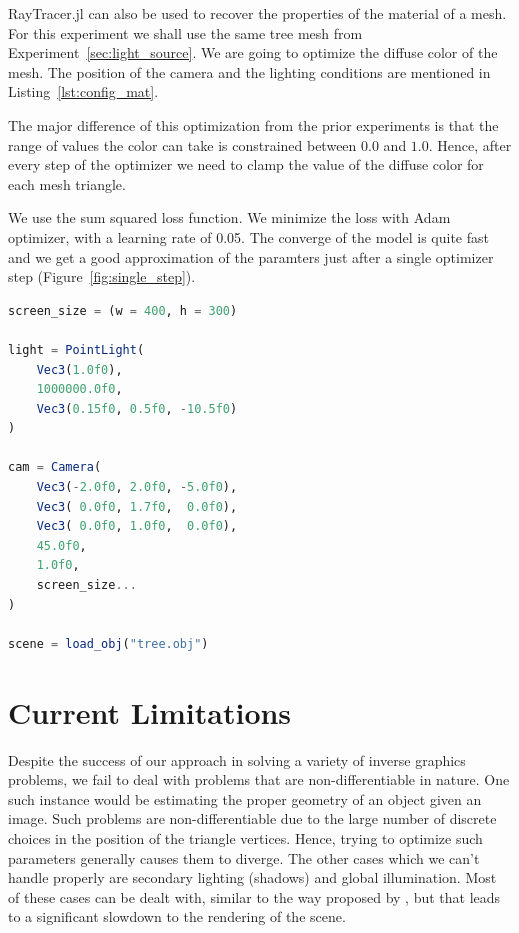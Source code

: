 \documentclass{juliacon}
\begin{document}
RayTracer.jl can also be used to recover the properties of the material of a mesh. For this experiment we shall use the same tree mesh from Experiment~\ref{sec:light_source}. We are going to optimize the diffuse color of the mesh. The position of the camera and the lighting conditions are mentioned in Listing~\ref{lst:config_mat}.

The major difference of this optimization from the prior experiments is that the range of values the color can take is constrained between $0.0$ and $1.0$. Hence, after every step of the optimizer we need to clamp the value of the diffuse color for each mesh triangle.

We use the sum squared loss function. We minimize the loss with Adam optimizer, with a learning rate of 0.05. The converge of the model is quite fast and we get a good approximation of the paramters just after a single optimizer step (Figure~\ref{fig:single_step}).

\begin{lstlisting}[caption = {Configuration of the Scene for Experiment~\ref{sec:mat_color}},
                   label = {lst:config_mat},
                   captionpos = b,
                   language = Julia]
screen_size = (w = 400, h = 300)

light = PointLight(
    Vec3(1.0f0),
    1000000.0f0,
    Vec3(0.15f0, 0.5f0, -10.5f0)
)

cam = Camera(
    Vec3(-2.0f0, 2.0f0, -5.0f0),
    Vec3( 0.0f0, 1.7f0,  0.0f0),
    Vec3( 0.0f0, 1.0f0,  0.0f0),
    45.0f0,
    1.0f0,
    screen_size...
)

scene = load_obj("tree.obj")
\end{lstlisting}


\section{Current Limitations}
\label{sec:limitation}

Despite the success of our approach in solving a variety of inverse graphics problems, we fail to deal with problems that are non-differentiable in nature. One such instance would be estimating the proper geometry of an object given an image. Such problems are non-differentiable due to the large number of discrete choices in the position of the triangle vertices. Hence, trying to optimize such parameters generally causes them to diverge. The other cases which we can't handle properly are secondary lighting (shadows) and global illumination. Most of these cases can be dealt with, similar to the way proposed by \cite{Li:2018:DMC}, but that leads to a significant slowdown to the rendering of the scene. 
\end{document}
